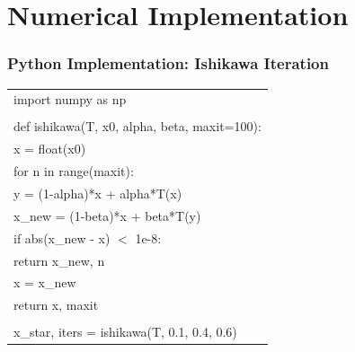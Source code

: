 \documentclass[aspectratio=169,10pt]{beamer}
\begin{document}
\section{Numerical Implementation}

\begin{frame}[fragile]
\frametitle{Python Implementation: Ishikawa Iteration}

\small
{\ttfamily
\begin{tabular}{l}
import numpy as np \\
\\
def ishikawa(T, x0, alpha, beta, maxit=100): \\
\quad x = float(x0) \\
\quad for n in range(maxit): \\
\quad \quad y = (1-alpha)*x + alpha*T(x) \\
\quad \quad x\_new = (1-beta)*x + beta*T(y) \\
\quad \quad if abs(x\_new - x) $<$ 1e-8: \\
\quad \quad \quad return x\_new, n \\
\quad \quad x = x\_new \\
\quad return x, maxit \\
\\
x\_star, iters = ishikawa(T, 0.1, 0.4, 0.6) \\
\end{tabular}
}

\end{frame}
\end{document}

